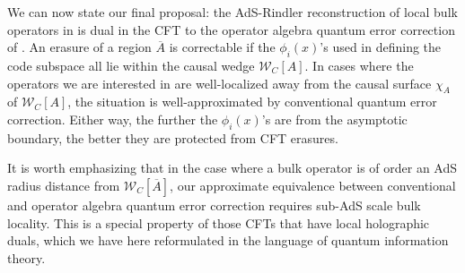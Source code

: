 \documentclass[12pt]{article}
\newcommand{\W}{\mathcal{W}}
\newcommand{\ol}{\overline}
\begin{document}
We can now state our final proposal: the AdS-Rindler reconstruction of local bulk operators in \cite{Hamilton:2006az,Morrison:2014jha} is dual in the CFT to the operator algebra quantum error correction of \cite{beny2007generalization,beny2007quantum}.  An erasure of a region $\ol{A}$ is correctable if the $\phi_i(x)$'s used in defining the code subspace all lie within the causal wedge $\W_C[A]$.  In cases where the operators we are interested in are well-localized away from the causal surface $\chi_A$ of $\W_C[A]$, the situation is well-approximated by conventional quantum error correction.  Either way, the further the $\phi_i(x)$'s are from the asymptotic boundary, the better they are protected from CFT erasures.

It is worth emphasizing that in the case where a bulk operator is of order an AdS radius distance from $\W_C[\ol{A}]$, our approximate equivalence between conventional and operator algebra quantum error correction requires sub-AdS scale bulk locality.  This is a special property of those CFTs that have local holographic duals, which we have here reformulated in the language of quantum information theory.
\end{document}

